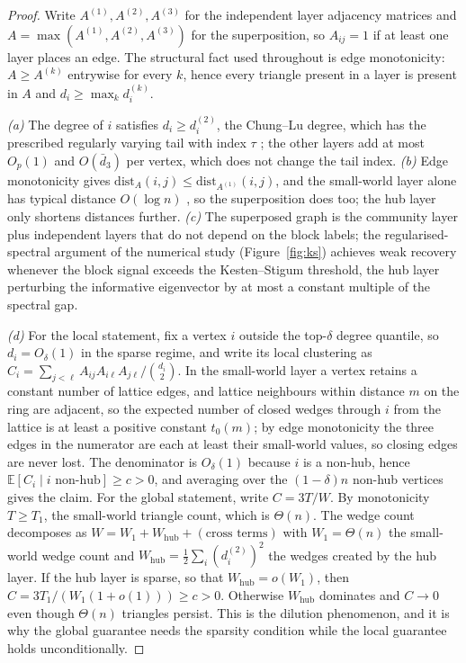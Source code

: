 \documentclass[12pt]{article}
\makeatletter
\def\subsection{\@startsection{subsection}{2}{\z@}{-0.13in}{0.03in}{\normalsize\bf\raggedright}}
\newcommand{\E}{\mathbb{E}}
\newcommand{\1}{\mathbf{1}}
\makeatother
\begin{document}
\subsection{Proof of Theorem~\ref{thm:pos}: possibility via synthesis}
\begin{proof}
Write $A^{(1)},A^{(2)},A^{(3)}$ for the independent layer adjacency matrices and
$A=\max(A^{(1)},A^{(2)},A^{(3)})$ for the superposition, so $A_{ij}=1$ if at least one layer places
an edge. The structural fact used throughout is edge monotonicity: $A\ge A^{(k)}$ entrywise for
every $k$, hence every triangle present in a layer is present in $A$ and $d_i\ge\max_kd_i^{(k)}$.

\emph{(a)} The degree of $i$ satisfies $d_i\ge d_i^{(2)}$, the Chung--Lu degree, which has the
prescribed regularly varying tail with index $\tau$ \citep{chung2002average}; the other layers add at
most $O_p(1)$ and $O(\bar d_3)$ per vertex, which does not change the tail index. \emph{(b)} Edge
monotonicity gives $\mathrm{dist}_A(i,j)\le\mathrm{dist}_{A^{(1)}}(i,j)$, and the small-world layer
alone has typical distance $O(\log n)$ \citep{watts1998collective}, so the superposition does too; the
hub layer only shortens distances further. \emph{(c)} The superposed graph is the community layer
plus independent layers that do not depend on the block labels; the regularised-spectral argument of
the numerical study (Figure~\ref{fig:ks}) achieves weak recovery whenever the block signal exceeds
the Kesten--Stigum threshold, the hub layer perturbing the informative eigenvector by at most a
constant multiple of the spectral gap.

\emph{(d)} For the local statement, fix a vertex $i$ outside the top-$\delta$ degree quantile, so
$d_i=O_\delta(1)$ in the sparse regime, and write its local clustering as
$C_i=\sum_{j<\ell}A_{ij}A_{i\ell}A_{j\ell}/\binom{d_i}{2}$. In the small-world layer a vertex retains
a constant number of lattice edges, and lattice neighbours within distance $m$ on the ring are
adjacent, so the expected number of closed wedges through $i$ from the lattice is at least a positive
constant $t_0(m)$; by edge monotonicity the three edges in the numerator are each at least their
small-world values, so closing edges are never lost. The denominator is $O_\delta(1)$ because $i$ is
a non-hub, hence $\E[C_i\mid i\text{ non-hub}]\ge c>0$, and averaging over the $(1-\delta)n$ non-hub
vertices gives the claim. For the global statement, write $C=3T/W$. By monotonicity $T\ge T_1$, the
small-world triangle count, which is $\Theta(n)$. The wedge count decomposes as
$W=W_1+W_{\mathrm{hub}}+(\text{cross terms})$ with $W_1=\Theta(n)$ the small-world wedge count and
$W_{\mathrm{hub}}=\tfrac12\sum_i(d_i^{(2)})^2$ the wedges created by the hub layer. If the hub layer
is sparse, so that $W_{\mathrm{hub}}=o(W_1)$, then $C=3T_1/(W_1(1+o(1)))\ge c>0$. Otherwise
$W_{\mathrm{hub}}$ dominates and $C\to0$ even though $\Theta(n)$ triangles persist. This is the
dilution phenomenon, and it is why the global guarantee needs the sparsity condition while the local
guarantee holds unconditionally.
\end{proof}
\end{document}
